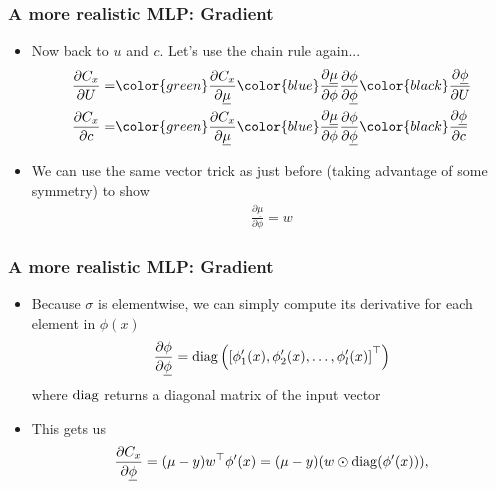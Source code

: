 \documentclass{beamer}
\begin{document}
\begin{frame}
\frametitle{A more realistic MLP: Gradient}

\begin{itemize}
\item Now back to $u$ and $c$. Let's use the chain rule again...
\begin{align*}
    \frac{\partial C_x}{\partial U} =& \color{green} \frac{\partial C_x}{\partial
    \underline{\mu}}
    \color{blue} \frac{\partial \underline{\mu}}{\partial \phi}
    \frac{\partial \phi}{\partial \underline{\phi}}
    \color{black} \frac{\partial \underline{\phi}}{\partial U} \\
    \frac{\partial C_x}{\partial c} =& \color{green}\frac{\partial C_x}{\partial
    \underline{\mu}}
    \color{blue} \frac{\partial \underline{\mu}}{\partial \phi}
     \frac{\partial \phi}{\partial \underline{\phi}}
    \color{black} \frac{\partial \underline{\phi}}{\partial c}
\end{align*}
\item We can use the same vector trick as just before (taking advantage of some symmetry) to show
\begin{align*}
    \frac{\partial \underline{\mu}}{\partial \phi} = w
\end{align*}
\end{itemize}

\end{frame}


\begin{frame}
\frametitle{A more realistic MLP: Gradient}


\begin{itemize}
\item Because $\sigma$ is elementwise, we can simply
compute its derivative for each element in $\phi(x)$
\begin{align*}
    \frac{\partial \phi}{\partial \underline{\phi}} = 
    \operatorname{diag}\left(\left[ \phi_1'(x), \phi_2'(x), \ldots, \phi_l'(x)
    \right]^\top\right)
\end{align*}
where $\operatorname{diag}$ returns a diagonal matrix of the input vector
\item This gets us 
\begin{align*}
\frac{\partial C_x}{\partial \underline{\phi}} = 
    (\mu - y)w^\top \phi'(x) = (\mu - y) (w \odot \operatorname{diag}(\phi'(x))),
\end{align*}
\end{itemize}

\end{frame}
\end{document}
